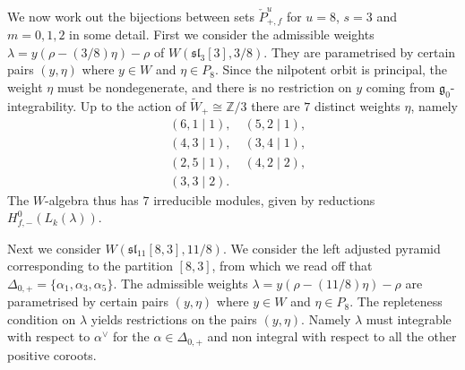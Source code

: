 \documentclass[12pt]{amsart}
\theoremstyle{plain}
\theoremstyle{definition}
\numberwithin{equation}{section}
\newcommand{\al}{\alpha}
\newcommand{\la}{\lambda}
\newcommand{\D}{\Delta}
\newcommand{\Z}{\mathbb{Z}}
\newcommand{\g}{\mathfrak{g}}
\newcommand{\sll}{\mathfrak{sl}}
\newcommand{\wtil}[1]{\widetilde#1}
\begin{document}
We now work out the bijections between sets $\check{P}_{+, f}^u$ for $u=8$, $s=3$ and $m = 0, 1, 2$ in some detail. %
First we consider the admissible weights $\la = y(\rho - (3/8)\eta) - \rho$ of $W(\sll_3[3], 3/8)$. They are parametrised by certain pairs $(y, \eta)$ where $y \in W$ and $\eta \in P_8$. Since the nilpotent orbit is principal, the weight $\eta$ must be nondegenerate, and there is no restriction on $y$ coming from $\g_0$-integrability. Up to the action of $\wtil{W}_+ \cong \Z/3$ there are $7$ distinct weights $\eta$, namely
\begin{align*}
&(6, 1 \mid 1), \quad
(5, 2 \mid 1), \\
&(4, 3 \mid 1), \quad
(3, 4 \mid 1), \\
&(2, 5 \mid 1), \quad
(4, 2 \mid 2), \\
&(3, 3 \mid 2).
\end{align*}
The $W$-algebra thus has $7$ irreducible modules, given by reductions $H^0_{f, -}(L_k(\la))$.

Next we consider $W(\sll_{11}[8, 3], 11/8)$. We consider the left adjusted pyramid corresponding to the partition $[8, 3]$, from which we read off that $\D_{0, +} = \{\al_1, \al_3, \al_5\}$. The admissible weights $\la = y(\rho - (11/8)\eta) - \rho$ are parametrised by certain pairs $(y, \eta)$ where $y \in W$ and $\eta \in P_8$. The repleteness condition on $\la$ yields restrictions on the pairs $(y, \eta)$. Namely $\la$ must integrable with respect to $\al^\vee$ for the $\al \in \D_{0, +}$ and non integral with respect to all the other positive coroots.
\end{document}
